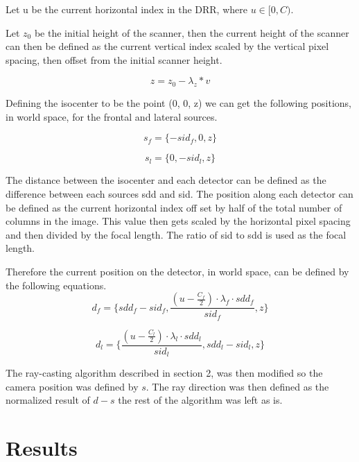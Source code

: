 \documentclass[12pt,twocolumn]{article}
\begin{document}
Let u be the current horizontal index in the DRR, where $u \in [0,C)$.

Let $z_0$ be the initial height of the scanner, then the current height of the scanner can then be defined as the 
current vertical index scaled by the vertical pixel spacing, then offset from the initial scanner height.

\begin{equation}
  z = z_0 - \lambda_z * v
\end{equation}

Defining the isocenter to be the point (0, 0, z) we can get the following positions, in world space, for the frontal 
and lateral sources.

\begin{equation}
  s_f = \{-sid_f,0,z\}
\end{equation}

\begin{equation}
  s_l = \{0,-sid_l,z\}
\end{equation}

The distance between the isocenter and each detector can be defined as the difference between each sources sdd and sid.
The position along each detector can be defined as the current horizontal index off set by half of the total number 
of columns in the image. This value then gets scaled by the horizontal pixel spacing and then divided by the focal
length. The ratio of sid to sdd is used as the focal length.

Therefore the current position on the detector, in world space, can be defined by the following equations.
\begin{equation}
  d_f = \{sdd_f-sid_f, \frac{(u - \frac{C_f}{2}) \cdot \lambda_f \cdot sdd_f}{sid_f},z\}
\end{equation}

\begin{equation}
  d_l = \{\frac{(u - \frac{C_l}{2}) \cdot \lambda_l \cdot sdd_l}{sid_l}, sdd_l-sid_l, z\}
\end{equation}

The ray-casting algorithm described in section 2, was then modified so the camera position was defined by $s$. The ray direction was then defined as the normalized result of $d-s$ the rest of the
algorithm was left as is.

\section{Results}
\end{document}
